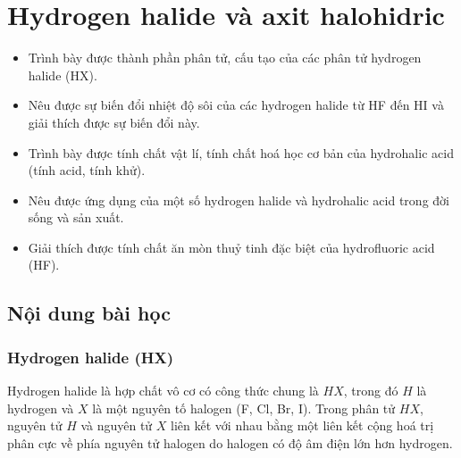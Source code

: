 \documentclass[Main.tex]{subfiles}
\begin{document}
\setcounter{section}{1}
\section{Hydrogen halide và axit halohidric}
\begin{Muctieu}
	\begin{itemize}
		\item Trình bày được thành phần phân tử, cấu tạo của các phân tử hydrogen halide (HX).
		\item Nêu được sự biến đổi nhiệt độ sôi của các hydrogen halide từ HF đến HI và giải thích được sự biến đổi này.
		\item Trình bày được tính chất vật lí, tính chất hoá học cơ bản của hydrohalic acid (tính acid, tính khử).
		\item Nêu được ứng dụng của một số hydrogen halide và hydrohalic acid trong đời sống và sản xuất.
		\item Giải thích được tính chất ăn mòn thuỷ tinh đặc biệt của hydrofluoric acid (HF).
	\end{itemize}
\end{Muctieu}
\begin{kd}
\end{kd}

\subsection{Nội dung bài học} 

\subsubsection{Hydrogen halide (HX)}
	\begin{ghinho}
		Hydrogen halide là hợp chất vô cơ có công thức chung là $HX$, trong đó $H$ là hydrogen và $X$ là một nguyên tố halogen (F, Cl, Br, I).
		Trong phân tử $HX$, nguyên tử $H$ và nguyên tử $X$ liên kết với nhau bằng một liên kết cộng hoá trị phân cực về phía nguyên tử halogen do halogen có độ âm điện lớn hơn hydrogen.
	\end{ghinho}
\end{document}
